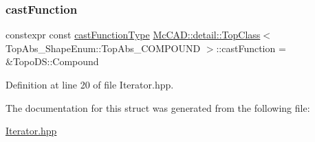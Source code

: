\subsubsection{\texorpdfstring{cast\+Function}{castFunction}}
{\footnotesize\ttfamily constexpr const \hyperlink{structMcCAD_1_1detail_1_1TopClass_3_01TopAbs__ShapeEnum_1_1TopAbs__COMPOUND_01_4_ac0820b58a85f0c76bc9de24042a90de0}{cast\+Function\+Type} \hyperlink{structMcCAD_1_1detail_1_1TopClass}{Mc\+C\+A\+D\+::detail\+::\+Top\+Class}$<$ Top\+Abs\+\_\+\+Shape\+Enum\+::\+Top\+Abs\+\_\+\+C\+O\+M\+P\+O\+U\+ND $>$\+::cast\+Function = \&Topo\+D\+S\+::\+Compound\hspace{0.3cm}{\ttfamily [static]}}



Definition at line 20 of file Iterator.\+hpp.



The documentation for this struct was generated from the following file\+:\begin{DoxyCompactItemize}
\item 
\hyperlink{Iterator_8hpp}{Iterator.\+hpp}\end{DoxyCompactItemize}
